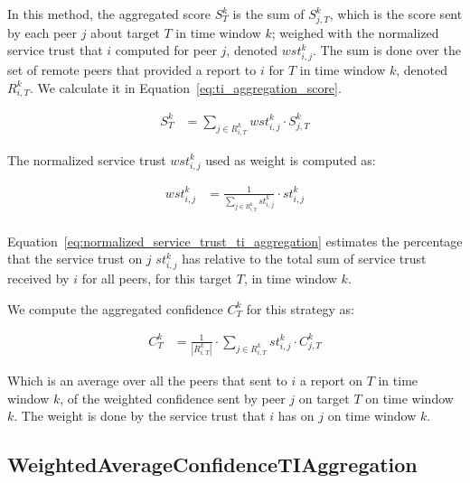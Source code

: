 In this method, the aggregated score $S^{k}_{T}$ is the sum of $S^{k}_{j, T}$, which is the score sent by each peer $j$ about target $T$ in time window $k$; weighed with the normalized service trust that $i$ computed for peer $j$, denoted $wst^{k}_{i, j}$. The sum is done over the set of remote peers that provided a report to $i$ for $T$ in time window $k$, denoted $R^{k}_{i, T}$. We calculate it in Equation~\ref{eq:ti_aggregation_score}.

\begin{equation}
\begin{split}
    S^{k}_{T} &= \sum_{{j}\in R^{k}_{i, T}} wst^{k}_{i, j} \cdot S^{k}_{j, T}
\end{split}
\label{eq:ti_aggregation_score}
\end{equation}

\noindent
The normalized service trust $wst^{k}_{i,j}$ used as weight is computed as:

\begin{equation}
\begin{split}
    wst^{k}_{i,j} &= \frac{1}{\sum_{{j}\in R^{k}_{i, T}} st^{k}_{i, j}} \cdot st^{k}_{i, j} \\
\end{split}
\label{eq:normalized_service_trust_ti_aggregation}
\end{equation}

\noindent
Equation~\ref{eq:normalized_service_trust_ti_aggregation} estimates the percentage that the service trust on $j$ $st^{k}_{i, j}$ has relative to the total sum of service trust received by $i$ for all peers, for this target $T$, in time window $k$.

We compute the aggregated confidence $C^{k}_{T}$ for this strategy as:

\begin{equation}
\begin{split}
    C^{k}_{T} &= \frac{1}{|R^{k}_{i, T}|} \cdot \sum_{{j}\in R^{k}_{i, T}} st^{k}_{i, j} \cdot C^{k}_{j, T}
\end{split}
\end{equation}

\noindent
Which is an average over all the peers that sent to $i$ a report on $T$ in time window $k$, of the weighted confidence sent by peer $j$ on target $T$ on time window $k$. The weight is done by the service trust that $i$ has on $j$ on time window $k$.


\subsection{WeightedAverageConfidenceTIAggregation}
\label{subsec:WeightedAverageConfidenceTIAggregation}

